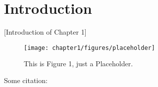 
\section{Introduction}

[Introduction of Chapter 1]

\begin{figure}
    \texttt{[image: chapter1/figures/placeholder]}
    \caption{This is Figure 1, just a Placeholder.}
\end{figure}


Some citation: \cite{Abbring2007}